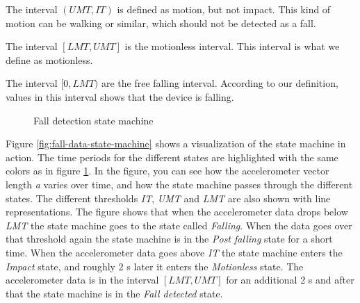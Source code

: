 \documentclass[12pt, a4paper, onecolumn]{article}
\begin{document}
	The interval \( (UMT, IT) \) is defined as motion, but not impact. This kind of motion can be walking or similar, which should not be detected as a fall.
	
	The interval \( [LMT, UMT] \) is the motionless interval. This interval is what we define as motionless.
	
	The interval \( [0, LMT) \) are the free falling interval. According to our definition, values in this interval shows that the device is falling. 
	
	\begin{figure}[H]
		\centering
		\caption{Fall detection state machine}%
		\label{fig:state-machine}%
	\end{figure}

	Figure \ref{fig:fall-data-state-machine} shows a visualization of the state machine in action. The time periods for the different states are highlighted with the same colors as in figure \ref{fig:state-machine}. In the figure, you can see how the accelerometer vector length \textit{a} varies over time, and how the state machine passes through the different states. The different thresholds \textit{IT}, \textit{UMT} and \textit{LMT} are also shown with line representations. The figure shows that when the accelerometer data drops below \textit{LMT} the state machine goes to the state called \textit{Falling}. When the data goes over that threshold again the state machine is in the \textit{Post falling} state for a short time. When the accelerometer data goes above \textit{IT} the state machine enters the \textit{Impact} state, and roughly 2 s later it enters the \textit{Motionless} state. The accelerometer data is in the interval \([LMT, UMT]\) for an additional 2 s and after that the state machine is in the \textit{Fall detected} state.
	
\end{document}
